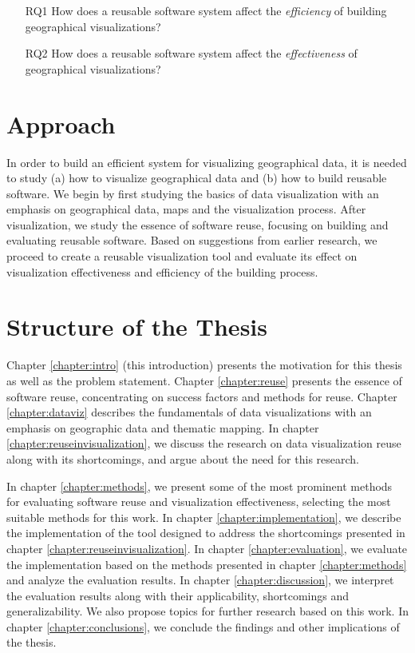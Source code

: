 \begin{enumerate}
	\item[RQ1] How does a reusable software system affect the \emph{efficiency} of building geographical visualizations?
	\item[RQ2] How does a reusable software system affect the \emph{effectiveness} of geographical visualizations?
\end{enumerate}



\section{Approach}

In order to build an efficient system for visualizing geographical data, it is needed to study (a) how to visualize geographical data and (b) how to build reusable software. We begin by first studying the basics of data visualization with an emphasis on geographical data, maps and the visualization process. After visualization, we study the essence of software reuse, focusing on building and evaluating reusable software. Based on suggestions from earlier research, we proceed to create a reusable visualization tool and evaluate its effect on visualization effectiveness and efficiency of the building process.

\section{Structure of the Thesis}
\label{section:structure} 

Chapter \ref{chapter:intro} (this introduction) presents the motivation for this thesis as well as the problem statement. Chapter \ref{chapter:reuse} presents the essence of software reuse, concentrating on success factors and methods for reuse. Chapter \ref{chapter:dataviz} describes the fundamentals of data visualizations with an emphasis on geographic data and thematic mapping. In chapter \ref{chapter:reuseinvisualization}, we discuss the research on data visualization reuse along with its shortcomings, and argue about the need for this research.

In chapter \ref{chapter:methods}, we present some of the most prominent methods for evaluating software reuse and visualization effectiveness, selecting the most suitable methods for this work. In chapter \ref{chapter:implementation}, we describe the implementation of the tool designed to address the shortcomings presented in chapter \ref{chapter:reuseinvisualization}. In chapter \ref{chapter:evaluation}, we evaluate the implementation based on the methods presented in chapter \ref{chapter:methods} and analyze the evaluation results. In chapter \ref{chapter:discussion}, we interpret the evaluation results along with their applicability, shortcomings and generalizability. We also propose topics for further research based on this work. In chapter \ref{chapter:conclusions}, we conclude the findings and other implications of the thesis.